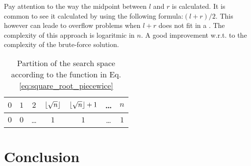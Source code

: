 Pay attention to the way the midpoint between $l$ and $r$ is calculated. 
It is common to see it calculated by using the following formula:$(l+r)/2$. This however can leade to overflow problems when $l+r$ does not fit in a .
The complexity of this approach is logaritmic in $n$. A good improvement w.r.t. to the complexity of the brute-force solution.

\begin{table}
	\centering
	\begin{tabular}{|c|c|c|c|c|c|c|}
		\hline
		$0$ & $1$ & $2$   & $\lfloor\sqrt{n}\rfloor$ & $\lfloor\sqrt{n}\rfloor+1$ & \ldots   & $n$ \\ \hline
		$0$ & $0$ & \ldots & $1$ & $1$ & \ldots & $1$   \\ \hline
	\end{tabular}
	\caption{Partition of the search space according to the function in Eq.
	\ref{eq:square_root_piecewice}}
	\label{tab:sqrt_split_space}
\end{table}


	



\section{Conclusion}
